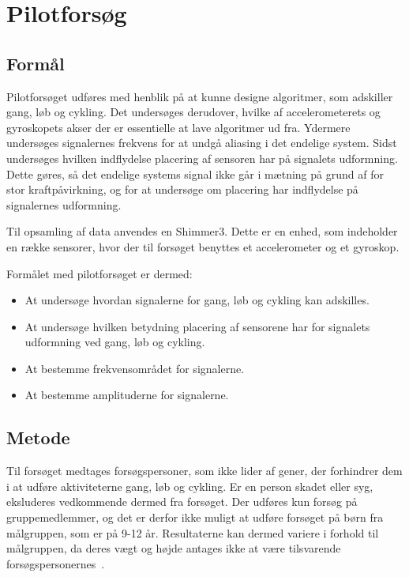 \chapter{Pilotforsøg}\vspace{-.75cm}\label{pilot}
\section{Formål}
Pilotforsøget udføres med henblik på at kunne designe algoritmer, som adskiller gang, løb og cykling. Det undersøges derudover, hvilke af accelerometerets og gyroskopets akser der er essentielle at lave algoritmer ud fra. Ydermere undersøges signalernes frekvens for at undgå aliasing i det endelige system. Sidst undersøges hvilken indflydelse placering af sensoren har på signalets udformning. Dette gøres, så det endelige systems signal ikke går i mætning på grund af for stor kraftpåvirkning, og for at undersøge om placering har indflydelse på signalernes udformning.

Til opsamling af data anvendes en Shimmer3. Dette er en enhed, som indeholder en række sensorer, hvor der til forsøget benyttes et accelerometer og et gyroskop. 

Formålet med pilotforsøget er dermed:
\begin{itemize}
	\item At undersøge hvordan signalerne for gang, løb og cykling kan adskilles. 
	\item At undersøge hvilken betydning placering af sensorene har for signalets udformning ved gang, løb og cykling. 
	\item At bestemme frekvensområdet for signalerne.
	\item At bestemme amplituderne for signalerne.
\end{itemize}

\section{Metode}
Til forsøget medtages forsøgspersoner, som ikke lider af gener, der forhindrer dem i at udføre aktiviteterne gang, løb og cykling. Er en person skadet eller syg, eksluderes vedkommende dermed fra forsøget. Der udføres kun forsøg på gruppemedlemmer, og det er derfor ikke muligt at udføre forsøget på børn fra målgruppen, som er på 9-12 år. Resultaterne kan dermed variere i forhold til målgruppen, da deres vægt og højde antages ikke at være tilsvarende forsøgspersonernes~\citep{Rigsholspitalet2014}. 

